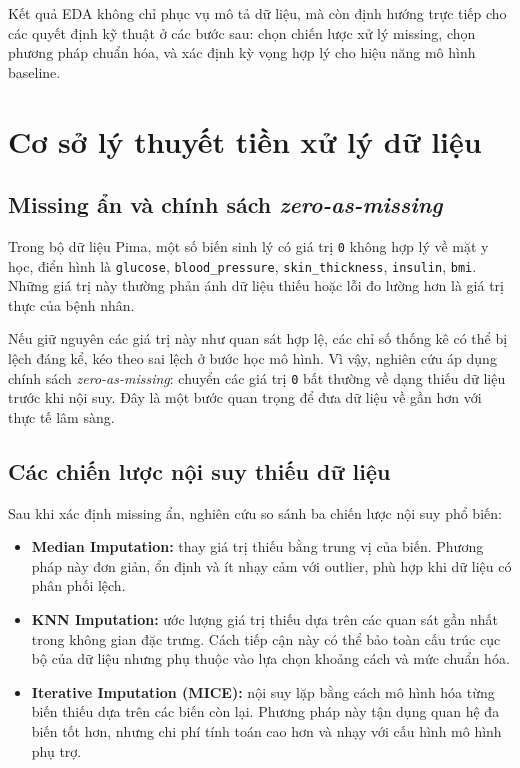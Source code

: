 Kết quả EDA không chỉ phục vụ mô tả dữ liệu, mà còn định hướng trực tiếp cho các quyết định kỹ thuật ở các bước sau:
chọn chiến lược xử lý missing, chọn phương pháp chuẩn hóa, và xác định kỳ vọng hợp lý cho hiệu năng mô hình baseline.

\section{Cơ sở lý thuyết tiền xử lý dữ liệu}
\subsection{Missing ẩn và chính sách \textit{zero-as-missing}}
Trong bộ dữ liệu Pima, một số biến sinh lý có giá trị \texttt{0} không hợp lý về mặt y học, điển hình là
\texttt{glucose}, \texttt{blood\_pressure}, \texttt{skin\_thickness}, \texttt{insulin}, \texttt{bmi}.
Những giá trị này thường phản ánh dữ liệu thiếu hoặc lỗi đo lường hơn là giá trị thực của bệnh nhân.

Nếu giữ nguyên các giá trị này như quan sát hợp lệ, các chỉ số thống kê có thể bị lệch đáng kể, kéo theo sai lệch ở bước học mô hình.
Vì vậy, nghiên cứu áp dụng chính sách \textit{zero-as-missing}: chuyển các giá trị \texttt{0} bất thường về dạng thiếu dữ liệu
trước khi nội suy. Đây là một bước quan trọng để đưa dữ liệu về gần hơn với thực tế lâm sàng.

\subsection{Các chiến lược nội suy thiếu dữ liệu}
Sau khi xác định missing ẩn, nghiên cứu so sánh ba chiến lược nội suy phổ biến:
\begin{itemize}[leftmargin=1.5em]
    \item \textbf{Median Imputation:} thay giá trị thiếu bằng trung vị của biến. Phương pháp này đơn giản, ổn định và ít nhạy cảm
    với outlier, phù hợp khi dữ liệu có phân phối lệch.
    \item \textbf{KNN Imputation:} ước lượng giá trị thiếu dựa trên các quan sát gần nhất trong không gian đặc trưng.
    Cách tiếp cận này có thể bảo toàn cấu trúc cục bộ của dữ liệu nhưng phụ thuộc vào lựa chọn khoảng cách và mức chuẩn hóa.
    \item \textbf{Iterative Imputation (MICE):} nội suy lặp bằng cách mô hình hóa từng biến thiếu dựa trên các biến còn lại.
    Phương pháp này tận dụng quan hệ đa biến tốt hơn, nhưng chi phí tính toán cao hơn và nhạy với cấu hình mô hình phụ trợ.
\end{itemize}

